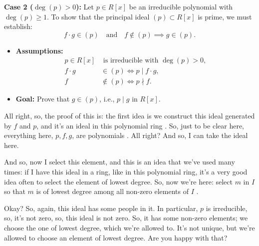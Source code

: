\begin{proofWrapper}
\begin{content}
\textbf{Case 2 ($\deg(p) > 0$):}
Let $p \in R[x]$ be an irreducible polynomial with $\deg(p) \ge 1$. To show that the principal ideal $(p) \subset R[x]$ is prime, we must establish:
\begin{equation}\label{eq:case2-prime-goal}
f \cdot g \in (p) \quad \text{and} \quad f \notin (p) \implies g \in (p).
\end{equation}
\begin{itemize}
    \item \textbf{Assumptions:}
    \begin{align}
        p \in R[x] &\text{ is irreducible with } \deg(p) > 0, \label{eq:assump-p} \\
        f \cdot g &\in (p) \iff p \mid f \cdot g, \label{eq:assump-fg} \\
        f &\notin (p) \iff p \nmid f. \label{eq:assump-f-not-p}
    \end{align}
    \item \textbf{Goal:} Prove that $g \in (p)$, i.e., $p \mid g$ in $R[x].$
\end{itemize}
\end{content}

\begin{speech}[00:16:44 - 00:18:50]
All right, so, the proof of this is: the first idea is we construct this ideal generated by $f$ and $p$, and it's an ideal in this polynomial ring . So, just to be clear here, everything here, $p, f, g$, are polynomials . All right? And so, I can take the ideal here.

And so, now I select this element, and this is an idea that we've used many times: if I have this ideal in a ring, like in this polynomial ring, it's a very good idea often to select the element of lowest degree. So, now we're here: select $m$ in $I$ so that $m$ is of lowest degree among all non-zero elements of $I$ .

Okay? So, again, this ideal has some people in it. In particular, $p$ is irreducible, so, it's not zero, so, this ideal is not zero. So, it has some non-zero elements; we choose the one of lowest degree, which we're allowed to. It's not unique, but we're allowed to choose an element of lowest degree. Are you happy with that?


\end{speech}
\end{proofWrapper}
